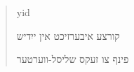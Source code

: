 \begin{abstract}
    \markboth{\abstractname}{}
\begin{scontents}[store-env=lang]
yid
\end{scontents}
\begin{scontents}[store-env=abstracts,print-env=true]
קורצע איבערזיכט אין ייִדיש
\end{scontents}

\begin{scontents}[store-env=keywords,print-env=true]
פינף צו זעקס שליסל-ווערטער
\end{scontents}
\end{abstract}
\cleardoublepage
{}
